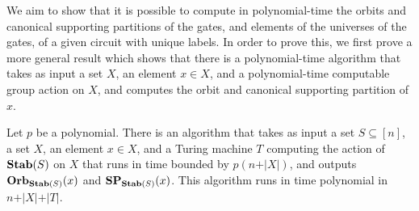 \documentclass[../main/thesis.tex]{subfiles}
\begin{document}
We aim to show that it is possible to compute in polynomial-time the orbits and
canonical supporting partitions of the gates, and elements of the universes of
the gates, of a given circuit with unique labels. In order to prove this, we
first prove a more general result which shows that there is a polynomial-time
algorithm that takes as input a set $X$, an element $x \in X$, and a
polynomial-time computable group action on $X$, and computes the orbit and
canonical supporting partition of $x$.

\begin{lem}
  \label{lem:computing-support-orbit}
  Let $p$ be a polynomial. There is an algorithm that takes as input a set $S
  \subseteq [n]$, a set $X$, an element $x \in X$, and a Turing machine $T$
  computing the action of $\text{\textbf{Stab}}(S)$ on $X$ that runs in time bounded by $p(n +
  \vert X \vert)$, and outputs $\text{\textbf{Orb}}_{\text{\textbf{Stab}}(S)} (x)$ and $\text{\textbf{SP}}_{\text{\textbf{Stab}}(S)}(x)$.
  This algorithm runs in time polynomial in $n + \vert X \vert + \vert T \vert$.
\end{lem}
\end{document}
